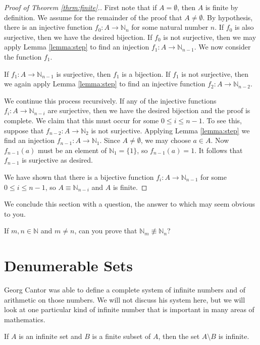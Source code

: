 \begin{proof}[Proof of Theorem \ref{thrm:finite}.]
First note that if $A=\emptyset$, then $A$ is finite by definition.  We assume for the remainder of the proof that $A\neq\emptyset$.  By hypothesis, there is an injective function $f_0:A\to\mathbb N_n$ for some natural number $n$.  If $f_0$ is also surjective, then we have the desired bijection.  If $f_0$ is not surjective, then we may apply Lemma \ref{lemma:step} to find an injection $f_1:A\to\mathbb N_{n-1}$.  We now consider the function $f_1$.

If $f_1:A\to\mathbb N_{n-1}$ is surjective, then $f_1$ is a bijection. If $f_1$ is not surjective, then we again apply Lemma \ref{lemma:step} to find an injective function $f_2:A\to\mathbb N_{n-2}$.

We continue this process recursively.  If any of the injective functions $f_i:A\to \mathbb N_{n-i}$ are surjective, then we have the desired bijection and the proof is complete.  We claim that this must occur for some $0\leq i\leq n-1$.  To see this, suppose that $f_{n-2}:A\to \mathbb N_2$ is not surjective.  Applying Lemma \ref{lemma:step} we find an injection $f_{n-1}:A\to\mathbb N_1$.  Since $A\neq\emptyset$, we may choose $a\in A$.  Now $f_{n-1}(a)$ must be an element of $\mathbb N_1= \{1\}$, so $f_{n-1}(a)=1$.  It follows that $f_{n-1}$ is surjective as desired.

We have shown that there is a bijective function $f_i:A\to\mathbb N_{n-1}$ for some $0\leq i\leq n-1$, so $A\equiv\mathbb N_{n-i}$ and $A$ is finite.
\end{proof}

We conclude this section with a question, the answer to which may seem obvious to you.

\begin{question}\label{quest:finite}
If $m,n\in\mathbb N$ and $m\neq n$, can you prove that $\mathbb N_m\not\equiv \mathbb N_n$?
\end{question}

\section{Denumerable Sets}

Georg Cantor was able to define a complete system of infinite numbers and of arithmetic on those numbers. We will not discuss his system here, but we will look at one particular kind of infinite number that is important in many areas of mathematics.

\begin{thrm}\label{thrm:infminusfin}
If $A$ is an infinite set and $B$ is a finite subset of $A$, then the set $A\setminus B$ is infinite.
\end{thrm}

